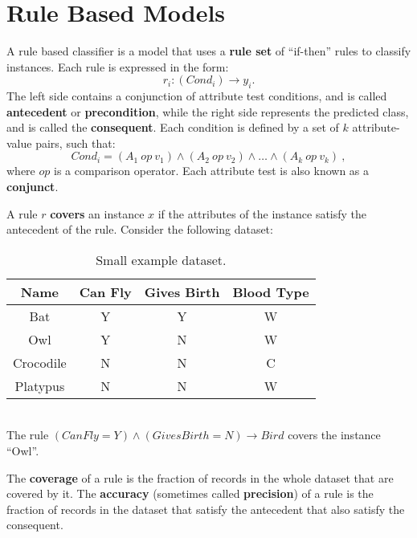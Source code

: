 \chapter{Rule Based Models}

A rule based classifier is a model that uses a \textbf{rule set} of ``if-then'' rules to classify instances. Each rule is expressed in the form:
\begin{equation*}
    r_i : (Cond_i) \xrightarrow{} y_i.
\end{equation*}
The left side contains a conjunction of attribute test conditions, and is called \textbf{antecedent} or \textbf{precondition}, while the right side represents the predicted class, and is called the \textbf{consequent}. Each condition is defined by a set of $k$ attribute-value pairs, such that:
\begin{equation*}
    Cond_i = (A_1 \ op \ v_1) \land (A_2 \ op \ v_2) \land \dots \land (A_k \ op \ v_k) \ ,
\end{equation*}
where $op$ is a comparison operator. Each attribute test is also known as a \textbf{conjunct}.

A rule $r$ \textbf{covers} an instance $x$ if the attributes of the instance satisfy the antecedent of the rule. Consider the following dataset:
\begin{table}[h]
    \centering
    \begin{tabular}{|c|c|c|c|}
    \hline
        Name & Can Fly & Gives Birth & Blood Type \\
    \hline
    \hline
        Bat & Y & Y & W \\
    \hline
        Owl & Y & N & W \\
    \hline
        Crocodile & N & N & C \\
    \hline
        Platypus & N & N & W \\
    \hline
    \end{tabular}
    \caption{Small example dataset.}
    \label{tab:small_dataset}
\end{table}
\\The rule $(Can Fly = Y) \land (Gives Birth = N) \xrightarrow{} Bird$ covers the instance ``Owl''.

The \textbf{coverage} of a rule is the fraction of records in the whole dataset that are covered by it. The \textbf{accuracy} (sometimes called \textbf{precision}) of a rule is the fraction of records in the dataset that satisfy the antecedent that also satisfy the consequent.

